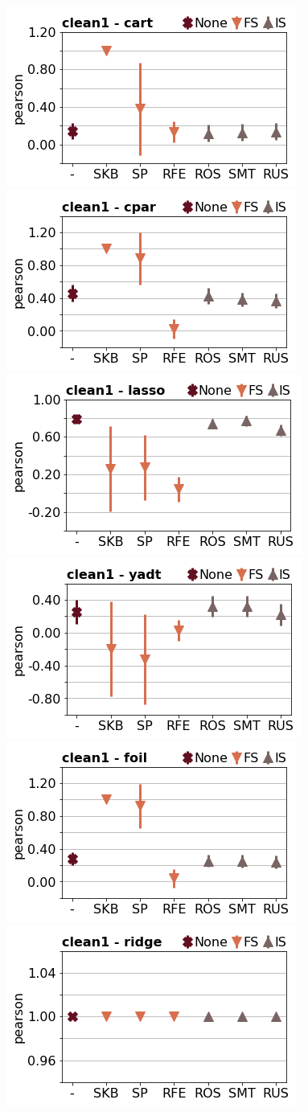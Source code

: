 \documentclass[runningheads,a4paper]{llncs}
\begin{document}
\begin{figure}[!h]
\includegraphics[width=0.32\linewidth]{fig/preps_clean1_DT_sklearn_sample_pearson.png}
\includegraphics[width=0.32\linewidth]{fig/preps_clean1_RB_cpar_sample_pearson.png}
\includegraphics[width=0.32\linewidth]{fig/preps_clean1_LM_lasso_sample_pearson.png}
\includegraphics[width=0.32\linewidth]{fig/preps_clean1_DT_yadt_sample_pearson.png}
\includegraphics[width=0.32\linewidth]{fig/preps_clean1_RB_foil_sample_pearson.png}
\includegraphics[width=0.32\linewidth]{fig/preps_clean1_LM_ridge_sample_pearson.png}
\end{figure}
\end{document}
